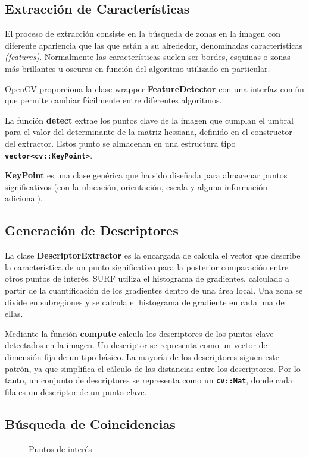 \subsection{Extracción de Características}

El proceso de extracción consiste en la búsqueda de zonas en la imagen
con diferente apariencia que las que están a su alrededor, denominadas características \textit{(features)}. Normalmente las características suelen ser bordes, esquinas o zonas más brillantes u oscuras en
función del algoritmo utilizado en particular.

OpenCV proporciona la clase wrapper \textbf{FeatureDetector} con una interfaz común que permite
cambiar fácilmente entre diferentes algoritmos.


La función \textbf{detect} extrae los puntos clave de la imagen que
cumplan el umbral para el valor del determinante de la matriz
hessiana, definido en el constructor del extractor. Estos punto se
almacenan en una estructura tipo \textbf{\texttt{vector<cv::KeyPoint>}}.

\textbf{KeyPoint} es una clase genérica que ha sido diseñada para
almacenar puntos significativos (con la ubicación, orientación, escala
y alguna información adicional).

\subsection{Generación de Descriptores}
La clase \textbf{DescriptorExtractor} es la encargada de calcula
el vector que describe la característica de un punto significativo
para la posterior comparación entre otros puntos de interés. SURF
utiliza el histograma de gradientes, calculado a partir de la
cuantificación de los gradientes dentro de una área local. Una zona se divide
en subregiones y se calcula el histograma de gradiente en cada una de
ellas.

Mediante la función \textbf{compute} calcula los descriptores de los
puntos clave detectados en la imagen. Un descriptor se representa como
un vector de dimensión fija de un tipo básico. La mayoría de los
descriptores siguen este patrón, ya que simplifica el cálculo de las
distancias entre los descriptores. Por lo tanto, un conjunto de
descriptores se representa como un \textbf{\texttt{cv::Mat}}, donde cada fila
es un descriptor de un punto clave.

\subsection{Búsqueda de Coincidencias}
\begin{figure}
\centering
{}
\caption{Puntos de interés} \label{fig:keypoints}
\end{figure}



